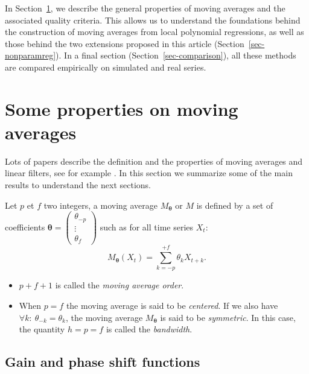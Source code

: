 \documentclass[
]{article}
\newcommand\1{\mathds{1}}
\begin{document}
In Section~\ref{sec-propMM}, we describe the general properties of
moving averages and the associated quality criteria. This allows us to
understand the foundations behind the construction of moving averages
from local polynomial regressions, as well as those behind the two
extensions proposed in this article (Section~\ref{sec-nonparamreg}). In
a final section (Section~\ref{sec-comparison}), all these methods are
compared empirically on simulated and real series.

\hypertarget{sec-propMM}{%
\section{Some properties on moving averages}\label{sec-propMM}}

Lots of papers describe the definition and the properties of moving
averages and linear filters, see for example \textcite{ch12HBSA}. In
this section we summarize some of the main results to understand the
next sections.

Let \(p\) et \(f\) two integers, a moving average
\(M_{\boldsymbol\theta}\) or \(M\) is defined by a set of coefficients
\(\boldsymbol\theta=\begin{pmatrix}\theta_{-p}\\\vdots\\\theta_{f}\end{pmatrix}\)
such as for all time series \(X_t\): \[
M_{\boldsymbol\theta}(X_t)=\sum_{k=-p}^{+f}\theta_kX_{t+k}.
\]

\begin{itemize}
\item
  \(p+f+1\) is called the \emph{moving average order}.
\item
  When \(p=f\) the moving average is said to be \emph{centered}. If we
  also have \(\forall k:\:\theta_{-k} = \theta_k\), the moving average
  \(M_{\boldsymbol\theta}\) is said to be \emph{symmetric}. In this
  case, the quantity \(h=p=f\) is called the \emph{bandwidth}.
\end{itemize}

\hypertarget{subsec:gain-deph}{%
\subsection{Gain and phase shift functions}\label{subsec:gain-deph}}
\end{document}
